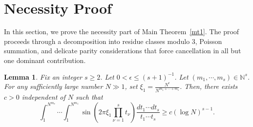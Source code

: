 \documentclass[10pt,a4paper]{amsart}
\newtheorem{lemma}{Lemma}\numberwithin{lemma}{section}
\numberwithin{equation}{section}
\begin{document}
\section{Necessity Proof}\label{sec10}
In this section, we prove the necessity part of Main Theorem~\ref{mt1}. The proof proceeds through a decomposition into residue classes modulo $3$, Poisson summation, and delicate parity considerations that force cancellation in all but one dominant contribution.
\begin{lemma}\label{propnec}
Fix an integer $s\geq2$. Let  $0<\epsilon\le (s+1)^{-1}$. Let $(m_1,\cdots,m_s)\in \mathbb{N}^{s}$. For any sufficiently large number $N\gg1$, set $\xi_1=\frac{N^{\epsilon}}{N^{m_1+\cdots+m_s}}$. Then, there exists $c>0$ independent of $N$ such that
$$ \int_{1}^{N^{m_s}}  \cdots \int_{1}^{N^{m_1}}  \sin\left(2\pi \xi_1 \prod_{\nu=1}^s t_\nu \right) \frac{dt_1\cdots dt_s}{t_1\cdots t_s} \ge c(\log N)^{s-1}.$$
\end{lemma}
\end{document}

